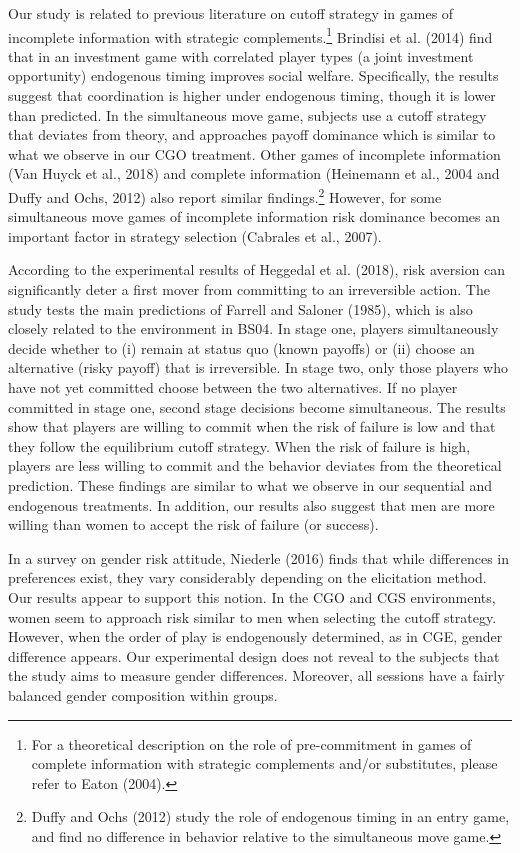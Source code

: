 \documentclass[12pt,english]{article}
\begin{document}
Our study is related to previous literature on cutoff strategy in games of incomplete information with strategic complements.\footnote{For a theoretical description on the role of pre-commitment in games of complete information with strategic complements and/or substitutes, please refer to Eaton (2004).} Brindisi et al. (2014) find that in an investment game with correlated player types (a joint investment opportunity) endogenous timing improves social welfare. Specifically, the results suggest that coordination is higher under endogenous timing, though it is lower than predicted. In the simultaneous move game, subjects use a cutoff strategy that deviates from theory, and approaches payoff dominance which is similar to what we observe in our CGO treatment. Other games of incomplete information (Van Huyck et al., 2018) and complete information (Heinemann et al., 2004 and Duffy and Ochs, 2012) also report similar findings.\footnote{Duffy and Ochs (2012) study the role of endogenous timing in an entry game, and find no difference in behavior relative to the simultaneous move game.} However, for some simultaneous move games of incomplete information risk dominance becomes an important factor in strategy selection (Cabrales et al., 2007).  


According to the experimental results of Heggedal et al. (2018), risk aversion can significantly deter a first mover from committing to an irreversible action. The study tests the main predictions of Farrell and Saloner (1985), which is also closely related to the environment in BS04. In stage one, players simultaneously decide whether to (i) remain at status quo (known payoffs) or (ii) choose an alternative (risky payoff) that is irreversible. In stage two, only those players who have not yet committed choose between the two alternatives. If no player committed in stage one, second stage decisions become simultaneous. The results show that players are willing to commit when the risk of failure is low and that they follow the equilibrium cutoff strategy. When the risk of failure is high, players are less willing to commit and the behavior deviates from the theoretical prediction. These findings are similar to what we observe in our sequential and endogenous treatments. In addition, our results also suggest that men are more willing than women to accept the risk of failure (or success). 

In a survey on gender risk attitude, Niederle (2016) finds that while differences in preferences exist, they vary considerably depending on the elicitation method. Our results appear to support this notion. In the CGO and CGS environments, women seem to approach risk similar to men when selecting the cutoff strategy. However, when the order of play is endogenously determined, as in CGE, gender difference appears. Our experimental design does not reveal to the subjects that the study aims to measure gender differences. Moreover, all sessions have a fairly balanced gender composition within groups. 
\end{document}
